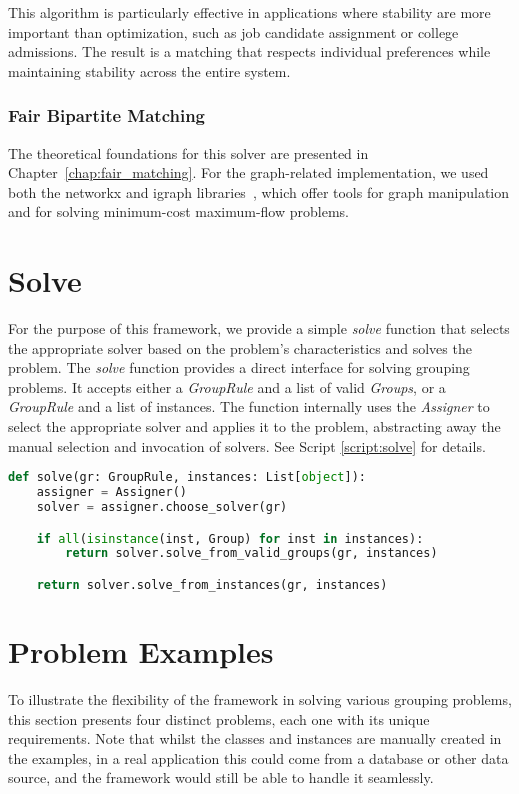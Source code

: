     This algorithm is particularly effective in applications where stability are more important than optimization, such as job candidate assignment or college admissions. The result is a matching that respects individual preferences while maintaining stability across the entire system.

    \subsubsection{Fair Bipartite Matching}

    The theoretical foundations for this solver are presented in Chapter~\ref{chap:fair_matching}.  
    For the graph-related implementation, we used both the networkx and igraph libraries~\cite{hagberg2008exploring, igraph}, which offer tools for graph manipulation and for solving minimum-cost maximum-flow problems.


    \section{Solve}
    For the purpose of this framework, we provide a simple \textit{solve} function that selects the appropriate solver based on the problem's characteristics and solves the problem.
    The \textit{solve} function provides a direct interface for solving grouping problems.
    It accepts either a \textit{GroupRule} and a list of valid \textit{Groups}, or a \textit{GroupRule} and a list of instances.
    The function internally uses the \textit{Assigner} to select the appropriate solver and applies it to the problem, abstracting away the manual selection and invocation of solvers.
    See Script \ref{script:solve} for details.

    \begin{lstlisting}[language=Python, caption={Solve.}, label={script:solve}]
def solve(gr: GroupRule, instances: List[object]):
    assigner = Assigner()
    solver = assigner.choose_solver(gr)

    if all(isinstance(inst, Group) for inst in instances):
        return solver.solve_from_valid_groups(gr, instances)

    return solver.solve_from_instances(gr, instances)
\end{lstlisting}

    \section{Problem Examples} \label{sec:examples}
To illustrate the flexibility of the framework in solving various grouping problems, this section presents four distinct problems, each one with its unique requirements.
Note that whilst the classes and instances are manually created in the examples, in a real application this could come from a database or other data source, and the framework would still be able to handle it seamlessly.


